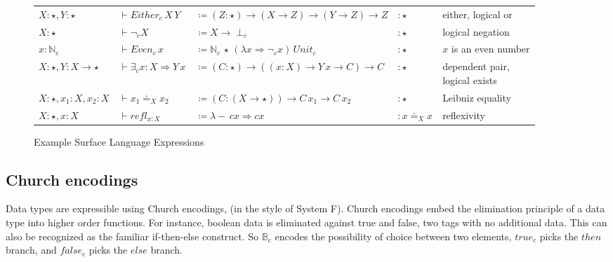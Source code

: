 \begin{sidewaysfigure}
\begin{tabular}{lllll}
$X:\star,Y:\star$ & $\vdash Either_{c}\,X\,Y$ & $\coloneqq\left(Z:\star\right)\rightarrow(X\rightarrow Z)\rightarrow(Y\rightarrow Z)\rightarrow Z$ & $:\star$ & either, logical or\tabularnewline
$X:\star$ & $\vdash\lnot_{c}X$ & $\coloneqq X\rightarrow\perp_{c}$ & $:\star$ & logical negation\tabularnewline
$x:\mathbb{N}_{c}$ & $\vdash Even_{c}\,x$ & $\coloneqq\mathbb{N}_{c}\,\star\,\left(\lambda x\Rightarrow\lnot_{c}x\right)\,Unit_{c}$ & $:\star$ & $x$ is an even number\tabularnewline
$X:\star,Y:X\rightarrow\star$ & $\vdash\exists_{c}x:X\Rightarrow Y\,x$ & $\coloneqq\left(C:\star\right)\rightarrow\left((x:X)\rightarrow Y\,x\rightarrow C\right)\rightarrow C$ & $:\star$ & \makecell[l]{dependent pair,\\ logical exists}\tabularnewline
$X:\star,x_{1}:X,x_{2}:X$ & $\vdash x_{1}\doteq_{X}x_{2}$ & $\coloneqq\left(C:\left(X\rightarrow\star\right)\right)\rightarrow C\,x_{1}\rightarrow C\,x_{2}$ & $:\star$ & Leibniz equality\tabularnewline
$X:\star,x:X$ & $\vdash refl_{x:X}$ & $\coloneqq\lambda-\,cx\Rightarrow cx$ & $:x\doteq_{X}x$ & reflexivity\tabularnewline
\end{tabular}

\caption{Example Surface Language Expressions}
\label{fig:surface-examples}
\end{sidewaysfigure}

\subsection{Church encodings}

Data types are expressible using Church encodings, (in the style of System F).
Church encodings embed the elimination principle of a data type into higher order functions.
For instance, boolean data is eliminated against true and false, two tags with no additional data.
This can also be recognized as the familiar if-then-else construct. 
So $\mathbb{B}_{c}$ encodes the possibility of choice between two elements, $true_{c}$ picks the $then$ branch, and $false_{c}$ picks the $else$ branch.

